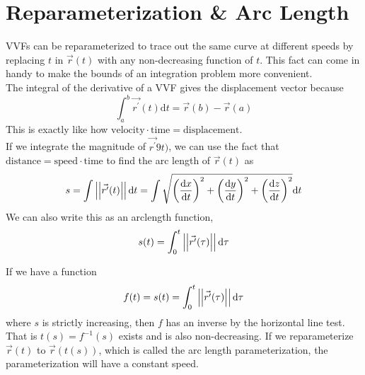 \section{Reparameterization \& Arc Length}
\noindent
VVFs can be reparameterized to trace out the same curve at different speeds by replacing $t$ in $\vec{r}(t)$ with any non-decreasing function of $t$. This fact can come in handy to make the bounds of an integration problem more convenient.\\

\noindent
The integral of the derivative of a VVF gives the displacement vector because
\begin{equation*}
	\int_{a}^{b}{\vec{r^\prime}(t)\mathrm{d}t}=\vec{r}(b)-\vec{r}(a)
\end{equation*}
This is exactly like how $\text{velocity}\cdot\text{time} = \text{displacement}$.\\

\noindent
If we integrate the magnitude of $\vec{r^\prime}9t)$, we can use the fact that $\text{distance} = \text{speed}\cdot\text{time}$ to find the arc length of $\vec{r}(t)$ as
\begin{equation*}
	s=\int{\left|\left|\vec{r^\prime}(t)\right|\right|\mathrm{d}t}=\int{\sqrt{\left(\frac{\mathrm{d}x}{\mathrm{d}t}\right)^2+\left(\frac{\mathrm{d}y}{\mathrm{d}t}\right)^2+\left(\frac{\mathrm{d}z}{\mathrm{d}t}\right)^2}\mathrm{d}t}
\end{equation*}
We can also write this as an arclength function,
\begin{equation*}
	s(t)=\int_{0}^{t}{\left|\left|\vec{r^{\prime}}(\tau)\right|\right|\mathrm{d}\tau}
\end{equation*}

\noindent
If we have a function
\begin{equation*}
	f(t)=s(t)=\int_{0}^{t}{\left|\left|\vec{r^{\prime}}(\tau)\right|\right|\mathrm{d}\tau}
\end{equation*}
where $s$ is strictly increasing, then $f$ has an inverse by the horizontal line test. That is $t(s) = f^{-1}(s)$ exists and is also non-decreasing. If we reparameterize $\vec{r}(t)$ to $\vec{r}(t(s))$, which is called the arc length parameterization, the parameterization will have a constant speed.